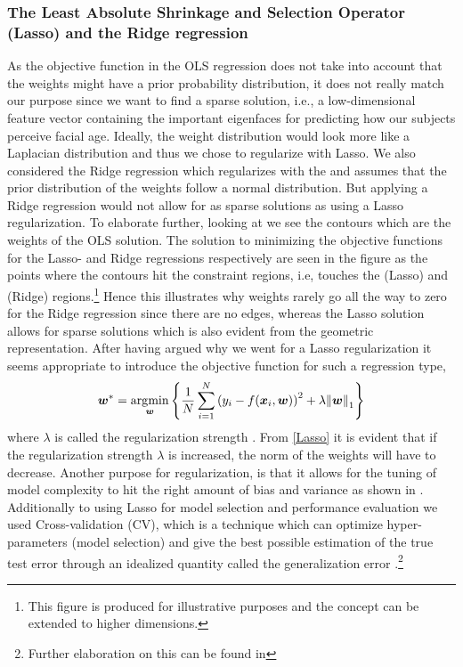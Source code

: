 \subsubsection{The Least Absolute Shrinkage and Selection Operator (Lasso) and the Ridge regression}
As the objective function in the OLS regression does not take into account that the weights might have a prior probability distribution, it does not really match our purpose since we want to find a sparse solution, i.e., a low-dimensional feature vector containing the important eigenfaces for predicting how our subjects perceive facial age. Ideally, the weight distribution would look more like a Laplacian distribution and thus we chose to regularize with Lasso. We also considered the Ridge regression which regularizes with the  and assumes that the prior distribution of the weights follow a normal distribution. But applying a Ridge regression would not allow for as sparse solutions as using a Lasso regularization. To elaborate further, looking at  we see the contours which are the weights of the OLS solution. The solution to minimizing the objective functions for the Lasso- and Ridge regressions respectively are seen in the figure as the points where the contours hit the constraint regions, i.e, touches the  (Lasso) and  (Ridge) regions.\footnote{This figure is produced for illustrative purposes and the concept can be extended to higher dimensions.} Hence this illustrates why weights rarely go all the way to zero for the Ridge regression since there are no edges, whereas the Lasso solution allows for sparse solutions which is also evident from the geometric representation. After having argued why we went for a Lasso regularization it seems appropriate to introduce the objective function for such a regression type, 
\begin{equation}\label{eq:Lasso}
    \bm{w}^{\ast} = \operatorname*{\arg\!\min}_{\bm{w}}\left\{ { \dfrac{1}{N} \sum_{i=1}^N \qty(y_i - f\qty(\bm{x}_i,\bm{w}))^2 + \lambda \norm{\bm{w}}_1} \right\}
\end{equation}
where $\lambda$ is called the regularization strength \cite{Tibshirani94regressionshrinkage}. From \eqref{Lasso} it is evident that if the regularization strength $\lambda$ is increased, the norm of the weights will have to decrease. Another purpose for regularization, is that it allows for the tuning of model complexity to hit the right amount of bias and variance as shown in . Additionally to using Lasso for model selection and performance evaluation we used Cross-validation (CV), which is a technique which can optimize hyper-parameters (model selection) and give the best possible estimation of the true test error through an idealized quantity called the generalization error \cite{allhailkingMorten}.\footnote{Further elaboration on this can be found in }


